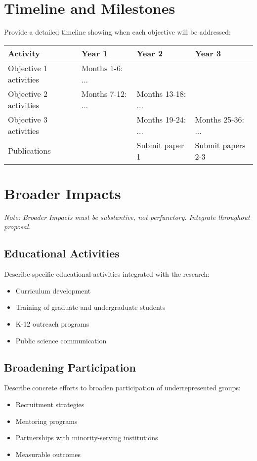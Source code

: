 \documentclass[11pt,letterpaper]{article}
\begin{document}
\section{Timeline and Milestones}
Provide a detailed timeline showing when each objective will be addressed:

\begin{center}
\begin{tabular}{|l|p{3cm}|p{3cm}|p{3cm}|}
\hline
\textbf{Activity} & \textbf{Year 1} & \textbf{Year 2} & \textbf{Year 3} \\
\hline
Objective 1 activities & Months 1-6: ... & & \\
\hline
Objective 2 activities & Months 7-12: ... & Months 13-18: ... & \\
\hline
Objective 3 activities & & Months 19-24: ... & Months 25-36: ... \\
\hline
Publications & & Submit paper 1 & Submit papers 2-3 \\
\hline
\end{tabular}
\end{center}

\section{Broader Impacts}
\textit{Note: Broader Impacts must be substantive, not perfunctory. Integrate throughout proposal.}

\subsection{Educational Activities}
Describe specific educational activities integrated with the research:
\begin{itemize}
    \item Curriculum development
    \item Training of graduate and undergraduate students
    \item K-12 outreach programs
    \item Public science communication
\end{itemize}

\subsection{Broadening Participation}
Describe concrete efforts to broaden participation of underrepresented groups:
\begin{itemize}
    \item Recruitment strategies
    \item Mentoring programs
    \item Partnerships with minority-serving institutions
    \item Measurable outcomes
\end{itemize}
\end{document}

